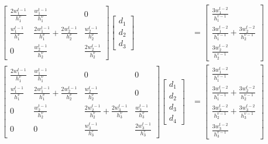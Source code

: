 \documentclass{article}
\begin{document}
\begin{align*}
  \begin{bmatrix}
    \frac{2w_1^{t-1}}{h_1^v} & \frac{w_1^{t-1}}{h_1^v} & 0 \\
    \frac{w_1^{t-1}}{h_1^v} & \frac{2w_1^{t-1}}{h_1^v}+\frac{2w_2^{t-1}}{h_2^v} & \frac{w_2^{t-1}}{h_2^v} \\
    0 & \frac{w_2^{t-1}}{h_2^v} & \frac{2w_2^{t-1}}{h_2^v}
  \end{bmatrix}
  \begin{bmatrix}
    d_1 \\ d_2 \\ d_3
  \end{bmatrix}
  &= 
  \begin{bmatrix}
    \frac{3w_1^{t-2}}{h_1^{v-1}} \\
    \frac{3w_1^{t-2}}{h_1^{v-1}}+\frac{3w_2^{t-2}}{h_2^{v-1}} \\
    \frac{3w_2^{t-2}}{h_2^{v-1}}
  \end{bmatrix} \\
  \begin{bmatrix}
    \frac{2w_1^{t-1}}{h_1^v} & \frac{w_1^{t-1}}{h_1^v} & 0 & 0\\
    \frac{w_1^{t-1}}{h_1^v} & \frac{2w_1^{t-1}}{h_1^v}+\frac{2w_2^{t-1}}{h_2^v} & \frac{w_2^{t-1}}{h_2^v} & 0 \\
    0 & \frac{w_2^{t-1}}{h_2^v} & \frac{2w_2^{t-1}}{h_2^v}+\frac{2w_3^{t-1}}{h_3^v} & \frac{w_3^{t-1}}{h_3^v} \\
    0 & 0 & \frac{w_3^{t-1}}{h_3^v} & \frac{2w_3^{t-1}}{h_3^v}
  \end{bmatrix}
  \begin{bmatrix}
    d_1 \\ d_2 \\ d_3 \\ d_4
  \end{bmatrix}
  &= 
  \begin{bmatrix}
    \frac{3w_1^{t-2}}{h_1^{v-1}} \\
    \frac{3w_1^{t-2}}{h_1^{v-1}}+\frac{3w_2^{t-2}}{h_2^{v-1}} \\
    \frac{3w_2^{t-2}}{h_2^{v-1}}+\frac{3w_3^{t-2}}{h_3^{v-1}} \\
    \frac{3w_3^{t-2}}{h_3^{v-1}}
  \end{bmatrix}
\end{align*}
\end{document}
